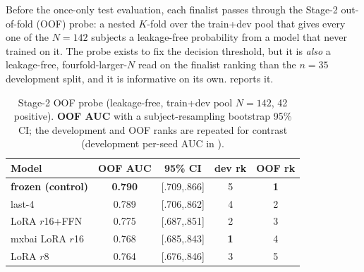 \documentclass[conference]{IEEEtran}
\begin{document}
Before the once-only test evaluation, each finalist passes through the Stage-2
out-of-fold (OOF) probe: a nested $K$-fold over the train+dev pool that gives
every one of the $N\!=\!142$ subjects a leakage-free probability from a model
that never trained on it. The probe exists to fix the decision threshold, but it
is \emph{also} a leakage-free, fourfold-larger-$N$ read on the finalist ranking
than the $n\!=\!35$ development split, and it is informative on its own.
 reports it.

\begin{table}[t]
\caption{Stage-2 OOF probe (leakage-free, train+dev pool $N\!=\!142$, 42
positive). \textbf{OOF AUC} with a subject-resampling bootstrap 95\% CI; the
development and OOF ranks are repeated for contrast (development per-seed AUC in
).}
\label{tab:ft-oof}
\centering\small
\setlength{\tabcolsep}{4pt}
\begin{tabular}{@{}lcccc@{}}
\toprule
\textbf{Model} & \textbf{OOF AUC} & \textbf{95\% CI} & \textbf{dev rk} & \textbf{OOF rk} \\
\midrule
\textbf{frozen (control)}      & \textbf{0.790} & [.709,.866] & 5 & \textbf{1} \\
last-4                         & 0.789 & [.706,.862] & 4 & 2 \\
LoRA $r$16+FFN                 & 0.775 & [.687,.851] & 2 & 3 \\
mxbai LoRA $r$16               & 0.768 & [.685,.843] & \textbf{1} & 4 \\
LoRA $r$8                      & 0.764 & [.676,.846] & 3 & 5 \\
\bottomrule
\end{tabular}
\end{table}
\end{document}
